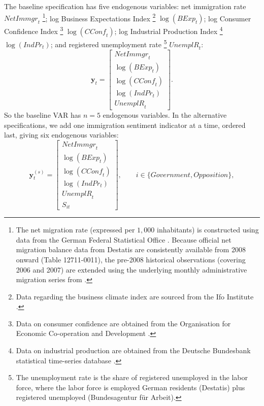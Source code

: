 \documentclass[12pt]{scrartcl}
\numberwithin{equation}{section}				%
\begin{document}
    The baseline specification has five endogenous variables: net immigration rate $\mathit{NetImmgr}_t$ \footnote{The net migration rate (expressed per $1{,}000$ inhabitants) is constructed using data from the German Federal Statistical Office \parencite{destatis_migration_balance, destatis_population}. Because official net migration balance data from Destatis are consistently available from 2008 onward (Table 12711-0011), the pre-2008 historical observations (covering 2006 and 2007) are extended using the underlying monthly administrative migration series from \textcite{maffei2021does}.}; log Business Expectations Index \footnote{Data regarding the business climate index are sourced from the Ifo Institute \parencite{ifo_bci_2026}.} $\log(\mathit{BExp}_t)$; log Consumer Confidence Index \footnote{Data on consumer confidence are obtained from the Organisation for Economic Co-operation and Development \parencite{oecd_cci}.} $\log(\mathit{CConf}_t)$; log Industrial Production Index \footnote{Data on industrial production are obtained from the Deutsche Bundesbank statistical time-series database \parencite{bundesbank_ip}.} $\log(\mathit{IndPr}_t)$; and registered unemployment rate \footnote{The unemployment rate is the share of registered unemployed in the labor force, where the labor force is employed German residents (Destatis) plus registered unemployed (Bundesagentur für Arbeit).} $\mathit{UnemplR}_t$:
    \begin{equation}
    	\mathbf{y}_t = \begin{bmatrix} \mathit{NetImmgr}_t \\ \log(\mathit{BExp}_t) \\ \log(\mathit{CConf}_t) \\ \log(\mathit{IndPr}_t) \\ \mathit{UnemplR}_t \end{bmatrix}.
    	\label{eq:baseline_variables}
    \end{equation}
    So the baseline VAR has $n=5$ endogenous variables.
    In the alternative specifications, we add one immigration sentiment indicator at a time, ordered last, giving six endogenous variables:
    \begin{equation}
    	\mathbf{y}_t^{(s)} = \begin{bmatrix} \mathit{NetImmgr}_t \\ \log(\mathit{BExp}_t) \\ \log(\mathit{CConf}_t) \\ \log(\mathit{IndPr}_t) \\ \mathit{UnemplR}_t \\ S_{it} \end{bmatrix}, \qquad i \in \{\mathit{Government}, \mathit{Opposition}\},
    	\label{eq:alt_variables}
    \end{equation}
\end{document}
